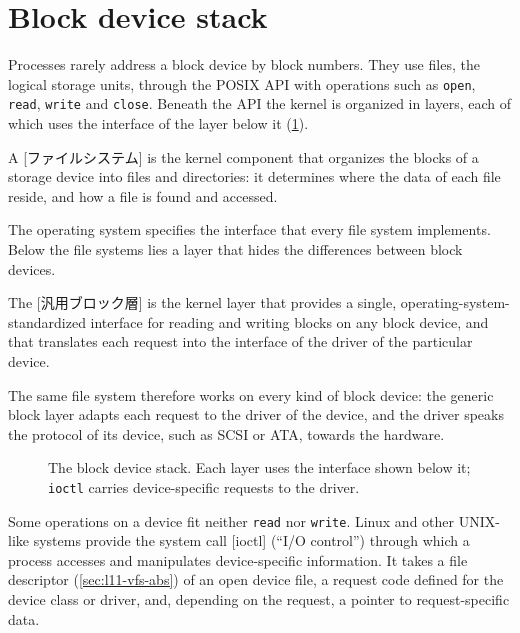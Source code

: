 \documentclass[../main.tex]{subfiles}
\begin{document}
\section{Block device stack}
\label{sec:l11-block-stack}

Processes rarely address a block device by block numbers.  They use files, the logical storage
units, through the POSIX API with operations such as \texttt{open},
\texttt{read}, \texttt{write} and \texttt{close}.
Beneath the API the kernel is organized in layers, each of which uses the
interface of the layer below it (\cref{fig:l11-block-stack}).

\begin{definition}
  A [ファイルシステム] is the kernel component that
  organizes the blocks of a storage device into files and directories: it
  determines where the data of each file reside, and how a file is found and
  accessed.
\end{definition}

The operating system specifies the interface that every file system
implements.  Below the file systems lies a layer that hides the differences
between block devices.

\begin{definition}
  The [汎用ブロック層] is the kernel layer that
  provides a single, operating-system-standardized interface for reading
  and writing blocks on any block device, and that translates each request
  into the interface of the driver of the particular device.
\end{definition}

The same file system therefore works on every kind of block device: the
generic block layer adapts each request to the driver of the device, and the
driver speaks the protocol of its device, such as SCSI or ATA, towards the
hardware.

\begin{figure}[htbp]
  \centering
  
  \caption{The block device stack.  Each layer uses the interface shown
    below it; \texttt{ioctl} carries device-specific requests to the
    driver.}
  \label{fig:l11-block-stack}
\end{figure}

Some operations on a device fit neither \texttt{read} nor \texttt{write}.
Linux and other UNIX-like systems provide the system call
[ioctl] (\enquote{I/O control}) through which a
process accesses and manipulates device-specific information.  It takes a
file descriptor (\cref{sec:l11-vfs-abs}) of an open device file, a request
code defined for the device class or driver, and, depending on the request,
a pointer to request-specific data.
\end{document}
